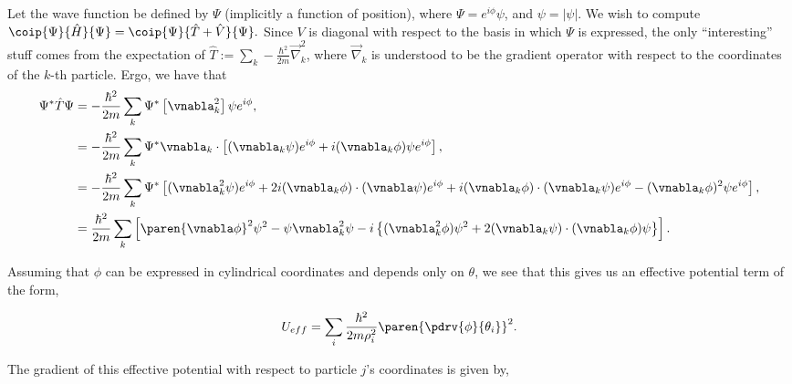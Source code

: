 \documentclass[onecolumn,amsmath,amssymb,nofootinbib,floatfix]{revtex4}
\begin{document}
Let the wave function be defined by $\Psi$ (implicitly a function of position), where $\Psi=e^{i\phi} \psi$, and $\psi=|\psi|$.  We wish to compute $\coip{\Psi}{\hat H}{\Psi} = \coip{\Psi}{\hat T+\hat V}{\Psi}.$  Since $V$ is diagonal with respect to the basis in which $\Psi$ is expressed, the only ``interesting'' stuff comes from the expectation of $\hat T:= \sum_k -\frac{\hbar^2}{2m}\vec{\nabla}^2_k$, where $\vec{\nabla}_k$ is understood to be the gradient operator with respect to the coordinates of the $k$-th particle.  Ergo, we have that
$$
\begin{aligned}
\Psi^* \hat T \Psi
&= -\frac{\hbar^2}{2m}\sum_k \Psi^*\left[\vnabla_k^2\right]\psi e^{i\phi},\\
&= -\frac{\hbar^2}{2m}\sum_k \Psi^* \vnabla_k\cdot \left[(\vnabla_k \psi) e^{i\phi} + i(\vnabla_k \phi) \psi e^{i\phi}\right],\\
&= -\frac{\hbar^2}{2m}\sum_k \Psi^* \left[(\vnabla_k^2 \psi) e^{i\phi} + 2 i(\vnabla_k \phi) \cdot(\vnabla\psi) e^{i\phi} + i(\vnabla_k\phi)\cdot(\vnabla_k\psi)e^{i\phi} - (\vnabla_k \phi)^2 \psi e^{i\phi}\right],\\
&= \frac{\hbar^2}{2m}\sum_k \left[\paren{\vnabla \phi}^2\psi^2 - \psi\vnabla_k^2\psi - i\left\{(\vnabla_k^2 \phi)\psi^2 + 2(\vnabla_k\psi) \cdot (\vnabla_k \phi)\psi\right\}\right].
\end{aligned}
$$

Assuming that $\phi$ can be expressed in cylindrical coordinates and depends only on $\theta$, we see that this gives us an effective potential term of the form,

$$U_{eff} = \sum_i \frac{\hbar^2}{2m\rho_i^2}\paren{\pdrv{\phi}{\theta_i}}^2.$$

The gradient of this effective potential with respect to particle $j$'s coordinates is given by,
\end{document}
